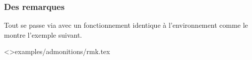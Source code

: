 \documentclass{tutodoc}
\begin{document}

\subsubsection{Des remarques}

Tout se passe via  avec un fonctionnement identique à l'environnement  comme le montre l'exemple suivant.


\tdoclatexinput<>{examples/admonitions/rmk.tex}
\end{document}
